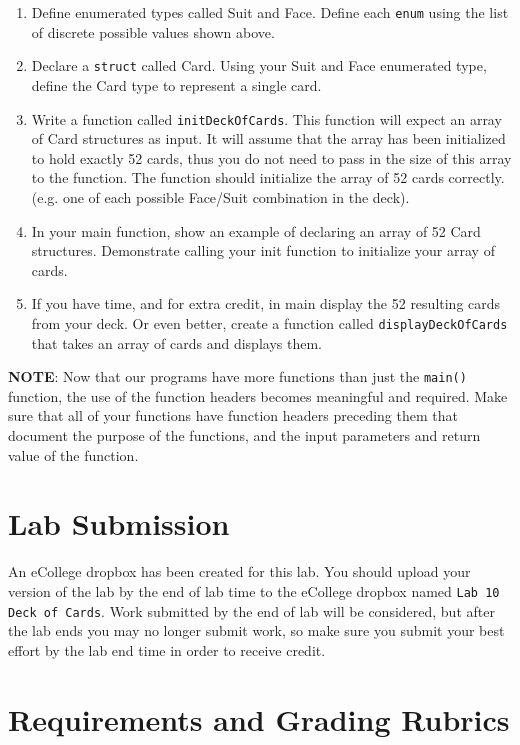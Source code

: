 \documentclass[11pt]{article}
\begin{document}
\begin{enumerate}
\item Define enumerated types called Suit and Face.  Define each \verb~enum~
using the list of discrete possible values shown above.

\item Declare a \verb~struct~ called Card.  Using your Suit and Face
enumerated type, define the Card type to represent
a single card.

\item Write a function called \verb~initDeckOfCards~.  This function will
expect an array of Card structures as input.  It will assume that
the array has been initialized to hold exactly 52 cards, thus you
do not need to pass in the size of this array to the function.  The
function should initialize the array of 52 cards
correctly. (e.g. one of each possible Face/Suit combination in the
deck).

\item In your main function, show an example of declaring an array of
52 Card structures.  Demonstrate calling your init function to
initialize your array of cards.

\item If you have time, and for extra credit, in main display the
52 resulting cards from your deck.  Or even better, create
a function called \verb~displayDeckOfCards~ that takes an array
of cards and displays them.
\end{enumerate}



\textbf{NOTE}: Now that our programs have more functions than just the
\verb~main()~ function, the use of the function headers becomes meaningful
and required.  Make sure that all of your functions have function
headers preceding them that document the purpose of the functions, and
the input parameters and return value of the function.
\section*{Lab Submission}
\label{sec-4}

An eCollege dropbox has been created for this lab.  You should upload
your version of the lab by the end of lab time to the eCollege dropbox
named \verb~Lab 10 Deck of Cards~.  Work submitted by the end of
lab will be considered, but after the lab ends you may no longer
submit work, so make sure you submit your best effort by the lab end
time in order to receive credit.
\section*{Requirements and Grading Rubrics}
\label{sec-5}
\end{document}
